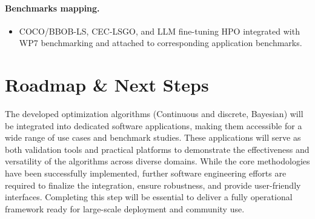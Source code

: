 \paragraph{Benchmarks mapping.}
\begin{itemize}
	\item COCO/BBOB-LS, CEC-LSGO, and LLM fine-tuning HPO integrated with WP7 benchmarking and attached to corresponding application benchmarks.
\end{itemize}

\section{Roadmap \& Next Steps}

The developed optimization algorithms (Continuous and discrete, Bayesian) will be integrated into dedicated software applications, making them accessible for a wide range of use cases and benchmark studies. These applications will serve as both validation tools and practical platforms to demonstrate the effectiveness and versatility of the algorithms across diverse domains. While the core methodologies have been successfully implemented, further software engineering efforts are required to finalize the integration, ensure robustness, and provide user-friendly interfaces. Completing this step will be essential to deliver a fully operational framework ready for large-scale deployment and community use.


